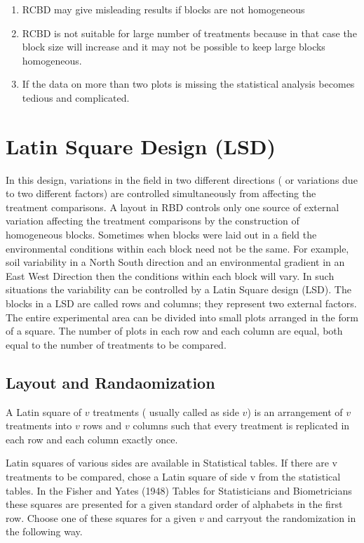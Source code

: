 \documentclass[
]{book}
\begin{document}
\begin{enumerate}
\def\labelenumi{\arabic{enumi}.}
\item
  RCBD may give misleading results if blocks are not homogeneous
\item
  RCBD is not suitable for large number of treatments because in that case the block size will increase and it may not be possible to keep large blocks
  homogeneous.
\item
  If the data on more than two plots is missing the statistical analysis becomes
  tedious and complicated.
\end{enumerate}

\hypertarget{latin-square-design-lsd}{%
\section{Latin Square Design (LSD)}\label{latin-square-design-lsd}}

In this design, variations in the field in two different directions ( or variations
due to two different factors) are controlled simultaneously from affecting the
treatment comparisons. A layout in RBD controls only one source of external
variation affecting the treatment comparisons by the construction of homogeneous
blocks. Sometimes when blocks were laid out in a field the environmental conditions
within each block need not be the same. For example, soil variability in a North South
direction and an environmental gradient in an East West Direction then the conditions
within each block will vary. In such situations the variability can be controlled by a
Latin Square design (LSD). The blocks in a LSD are called rows and columns; they
represent two external factors. The entire experimental area can be divided into small
plots arranged in the form of a square. The number of plots in each row and each
column are equal, both equal to the number of treatments to be compared.

\hypertarget{layout-and-randaomization}{%
\subsection{Layout and Randaomization}\label{layout-and-randaomization}}

A Latin square of \(v\) treatments ( usually called as side \(v\)) is an arrangement of
\(v\) treatments into \(v\) rows and \(v\) columns such that every treatment is replicated in each
row and each column exactly once.

Latin squares of various sides are available in Statistical tables. If there are v
treatments to be compared, chose a Latin square of side v from the statistical tables. In
the Fisher and Yates (1948) Tables for Statisticians and Biometricians these squares
are presented for a given standard order of alphabets in the first row. Choose one of
these squares for a given \(v\) and carryout the randomization in the following way.
\end{document}
